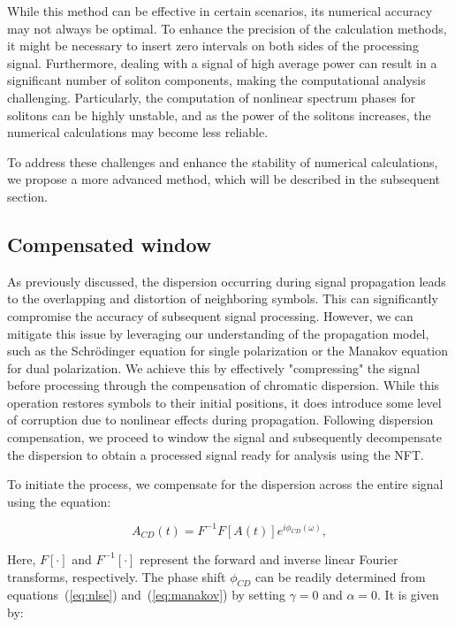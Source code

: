 While this method can be effective in certain scenarios, its numerical accuracy may not always be optimal. To enhance the precision of the calculation methods, it might be necessary to insert zero intervals on both sides of the processing signal. Furthermore, dealing with a signal of high average power can result in a significant number of soliton components, making the computational analysis challenging. Particularly, the computation of nonlinear spectrum phases for solitons can be highly unstable, and as the power of the solitons increases, the numerical calculations may become less reliable.

To address these challenges and enhance the stability of numerical calculations, we propose a more advanced method, which will be described in the subsequent section.

\subsection{Compensated window}

As previously discussed, the dispersion occurring during signal propagation leads to the overlapping and distortion of neighboring symbols. This can significantly compromise the accuracy of subsequent signal processing. However, we can mitigate this issue by leveraging our understanding of the propagation model, such as the Schr\"odinger equation for single polarization or the Manakov equation for dual polarization. We achieve this by effectively "compressing" the signal before processing through the compensation of chromatic dispersion. While this operation restores symbols to their initial positions, it does introduce some level of corruption due to nonlinear effects during propagation. Following dispersion compensation, we proceed to window the signal and subsequently decompensate the dispersion to obtain a processed signal ready for analysis using the NFT.

To initiate the process, we compensate for the dispersion across the entire signal using the equation:

\begin{equation}
A_{CD}(t) = F^{-1}F[A(t)]e^{i\phi_{CD}(\omega)} {,}
\end{equation}

Here, $F[\cdot]$ and $F^{-1}[\cdot]$ represent the forward and inverse linear Fourier transforms, respectively. The phase shift $\phi_{CD}$ can be readily determined from equations~(\ref{eq:nlse}) and~(\ref{eq:manakov}) by setting $\gamma = 0$ and $\alpha = 0$. It is given by:

